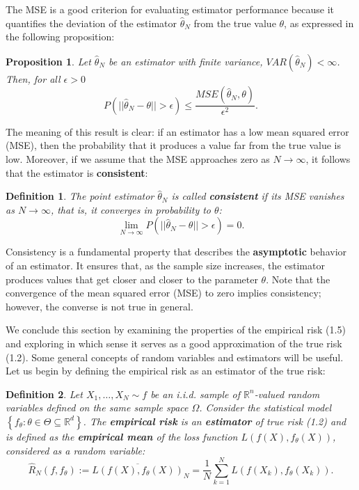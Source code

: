 \documentclass{report}
\newtheorem{definition}{Definition}[chapter]
\newtheorem{proposition}{Proposition}[chapter]
\begin{document}
The MSE is a good criterion for evaluating estimator performance because it quantifies the deviation of the estimator $\hat{\theta}_N$ from the true value $\theta$, as expressed in the following proposition:

\begin{proposition}
Let $\hat{\theta}_N$ be an estimator with finite variance, $VAR(\hat{\theta}_N) < \infty$. Then, for all $\epsilon > 0$
\begin{equation}
P(||\hat{\theta}_N -\theta|| > \epsilon) \leq \frac{MSE(\hat{\theta}_N,\theta)}{\epsilon ^ 2}.
\end{equation}
\end{proposition}

The meaning of this result is clear: if an estimator has a low mean squared error (MSE), then the probability that it produces a value far from the true value is low. Moreover, if we assume that the MSE approaches zero as $N \to \infty$, it follows that the estimator is \textbf{consistent}:

\begin{definition}
The point estimator $\hat{\theta}_N$ is called \textbf{consistent} if its MSE vanishes as $N \to \infty$, that is, it converges in probability to $\theta$:
\begin{equation}
\lim_{N \to \infty} P(||\hat{\theta}_N -\theta|| > \epsilon) = 0.
\end{equation}
\end{definition}

Consistency is a fundamental property that describes the \textbf{asymptotic} behavior of an estimator. It ensures that, as the sample size increases, the estimator produces values that get closer and closer to the parameter $\theta$. Note that the convergence of the mean squared error (MSE) to zero implies consistency; however, the converse is not true in general.

We conclude this section by examining the properties of the empirical risk (1.5) and exploring in which sense it serves as a good approximation of the true risk (1.2). Some general concepts of random variables and estimators will be useful. Let us begin by defining the empirical risk as an estimator of the true risk:

\begin{definition}
Let $X_1,\dots,X_N \sim f$ be an i.i.d. sample of $\mathbb{R}^n$-valued random variables defined on the same sample space $\Omega$. Consider the statistical model $\left\{f_\theta : \theta \in \Theta \subseteq \mathbb{R}^d\right\}$. The \textbf{empirical risk} is an \textbf{estimator} of true risk (1.2) and is defined as the \textbf{empirical mean} of the loss function $L(f(X), f_\theta(X))$, considered as a random variable:
\begin{equation}
\hat{R}_N(f,f_\theta) := \overline{L(f(X),f_\theta(X))}_N = \frac{1}{N}\sum_{k=1}^{N}L(f(X_k),f_\theta(X_k)).
\end{equation}
\end{definition}
\end{document}
